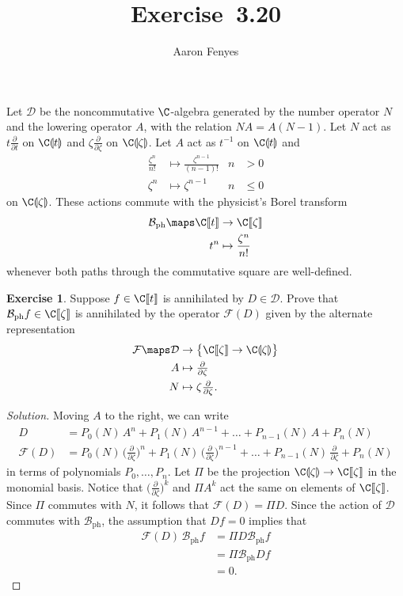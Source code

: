 \documentclass{article}
\title{Exercise~3.20}
\author{Aaron Fenyes}
\theoremstyle{definition}
\newtheorem*{exr}{Exercise}
\theoremstyle{plain}
\newcommand{\phborel}{\mathcal{B}_\text{ph}}
\newcommand{\dict}{\mathcal{F}}
\begin{document}
\maketitle
Let $\mathcal{D}$ be the noncommutative $\C$-algebra generated by the number operator $N$ and the lowering operator $A$, with the relation $NA = A(N-1)$. Let $N$ act as $t \tfrac{\partial}{\partial t}$ on $\C\llparenthesis t \rrparenthesis$ and $\zeta \tfrac{\partial}{\partial \zeta}$ on $\C\llparenthesis \zeta \rrparenthesis$. Let $A$ act as $t^{-1}$ on $\C\llparenthesis t \rrparenthesis$ and
\begin{align*}
\frac{\zeta^n}{n!} & \mapsto \frac{\zeta^{n-1}}{(n-1)!} & n & > 0 \\
\zeta^n & \mapsto \zeta^{n-1} & n & \le 0
\end{align*}
on $\C\llparenthesis \zeta \rrparenthesis$. These actions commute with the physicist's Borel transform
\begin{align*}
\phborel \maps \C\llbracket t \rrbracket & \to \C\llbracket \zeta \rrbracket \\
t^n & \mapsto \frac{\zeta^n}{n!}
\end{align*}
whenever both paths through the commutative square are well-defined.
\begin{exr}
Suppose $f \in \C\llbracket t \rrbracket$ is annihilated by $D \in \mathcal{D}$. Prove that $\phborel f \in \C\llbracket \zeta \rrbracket$ is annihilated by the operator $\dict(D)$ given by the alternate representation
\begin{align*}
\dict \maps \mathcal{D} & \to \big\{\C\llbracket \zeta \rrbracket \to \C\llparenthesis \zeta \rrparenthesis\big\} \\
A & \mapsto \tfrac{\partial}{\partial \zeta} \\
N & \mapsto \zeta \tfrac{\partial}{\partial \zeta}.
\end{align*}
\end{exr}
\begin{proof}[Solution]
Moving $A$ to the right, we can write
\begin{align*}
D & = P_0(N)\,A^n + P_1(N)\,A^{n-1} + \ldots + P_{n-1}(N)\,A + P_n(N) \\
\dict(D) & = P_0(N)\,\big(\tfrac{\partial}{\partial \zeta}\big)^n + P_1(N)\,\big(\tfrac{\partial}{\partial \zeta}\big)^{n-1} + \ldots + P_{n-1}(N)\,\tfrac{\partial}{\partial \zeta} + P_n(N)
\end{align*}
in terms of polynomials $P_0, \ldots, P_n$. Let $\Pi$ be the projection $\C\llparenthesis \zeta \rrparenthesis \to \C\llbracket \zeta \rrbracket$ in the monomial basis. Notice that $\big(\tfrac{\partial}{\partial \zeta}\big)^k$ and $\Pi A^k$ act the same on elements of $\C\llbracket \zeta \rrbracket$. Since $\Pi$ commutes with $N$, it follows that $\dict(D) = \Pi D$. Since the action of $\mathcal{D}$ commutes with $\phborel$, the assumption that $Df = 0$ implies that
\begin{align*}
\dict(D)\,\phborel f & = \Pi D \phborel f \\
& = \Pi \phborel Df \\
& = 0.
\end{align*}
\end{proof}
\end{document}
